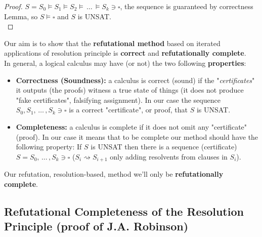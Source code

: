 \begin{proof}
	$S = S_0 \models S_1 \models S_2 \models \, \dots \, \models S_k \ni \square$, the sequence is guaranteed by correctness Lemma, so $S \models \square$ and $S$ is UNSAT.\\
\end{proof}

\newpage


Our aim is to show that the \textbf{refutational method} based on iterated applications of resolution principle is \textbf{correct} and \textbf{refutationally complete}.\\

In general, a logical calculus may have (or not) the two following \textbf{properties}:
\begin{itemize}
	\item \textbf{Correctness (Soundness):} a calculus is correct (sound) if the "\textit{certificates}" it outputs (the proofs) witness a true state of things (it does not produce "fake certificates", falsifying assignment). In our case the sequence $S_0, S_1, \, \dots \, , S_k \ni \square$ is a correct "certificate", or proof, that $S$ is UNSAT.\\
	
	\item \textbf{Completeness:} a calculus is complete if it does not omit any "certificate" (proof). In our case it means that to be complete our method should have the following property: If $S$ is UNSAT then there is a sequence (certificate) $S = S_0, \, \dots \, , S_k \ni \square$ ($S_i \rightsquigarrow S_{i+1}$ only adding resolvents from clauses in $S_i$).\\
\end{itemize} 


Our refutation, resolution-based, method we'll only be \textbf{refutationally complete}.\\

\subsection{Refutational Completeness of the Resolution Principle (proof of J.A. Robinson)}

